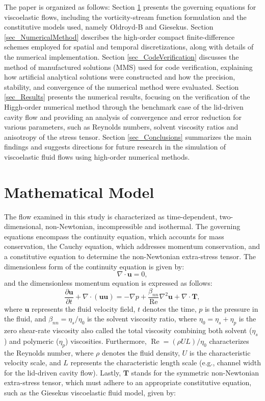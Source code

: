 \documentclass[preprint, 12pt]{elsarticle}
\begin{document}
The paper is organized as follows: Section \ref{sec_MathematicalModel} presents the governing equations for viscoelastic flows, including the vorticity-stream function formulation and the constitutive models used, namely Oldroyd-B and Giesekus. Section \ref{sec_NumericalMethod} describes the high-order compact finite-difference schemes employed for spatial and temporal discretizations, along with details of the numerical implementation. Section \ref{sec_CodeVerification} discusses the method of manufactured solutions (MMS) used for code verification, explaining how artificial analytical solutions were constructed and how the precision, stability, and convergence of the numerical method were evaluated. Section \ref{sec_Results} presents the numerical results, focusing on the verification of the Higgh-order numerical method through the benchmark case of the lid-driven cavity flow and providing an analysis of convergence and error reduction for various parameters, such as Reynolds numbers, solvent viscosity ratios and anisotropy of the stress tensor. Section \ref{sec_Conclusions} summarizes the main findings and suggests directions for future research in the simulation of viscoelastic fluid flows using high-order numerical methods.

\section{Mathematical Model}\label{sec_MathematicalModel}
\unskip
The flow examined in this study is characterized as time-dependent, two-dimensional, non-Newtonian, incompressible and isothermal. The governing equations encompass the continuity equation, which accounts for mass conservation, the Cauchy equation, which addresses momentum conservation, and a constitutive equation to determine the non-Newtonian extra-stress tensor. The dimensionless form of the continuity equation is given by:
\begin{equation}
    \nabla\cdot\mathbf{u} = 0,\label{eq_conservation}
\end{equation}
and the dimensionless momentum equation is expressed as follows:
\begin{equation}
    \dfrac{\partial\mathbf{u}}{\partial t} + \nabla\cdot(\mathbf{uu}) = -\nabla p + \dfrac{\beta_{nn}}{\operatorname{Re}}\nabla^{2}\mathbf{u} + \nabla\cdot\mathbf{T},\label{eq_momentun}
\end{equation}
where $\mathbf{u}$ represents the fluid velocity field, $t$ denotes the time, $p$ is the pressure in the fluid, and $\beta_{nn} = \eta_{s}/\eta_{0}$ is the solvent viscosity ratio, where $\eta_{0} = \eta_{s} + \eta_{p}$ is the zero shear-rate viscosity also called the total viscosity combining both solvent ($\eta_{s}$) and polymeric ($\eta_{p}$) viscosities. Furthermore, $\operatorname{Re} = (\rho U L)/\eta_{0}$ characterizes the Reynolds number, where $\rho$ denotes the fluid density, $U$ is the characteristic velocity scale, and $L$ represents the characteristic length scale (e.g., channel width for the lid-driven cavity flow). Lastly, $\mathbf{T}$ stands for the symmetric non-Newtonian extra-stress tensor, which must adhere to an appropriate constitutive equation, such as the Giesekus viscoelastic fluid model, given by:
\end{document}
